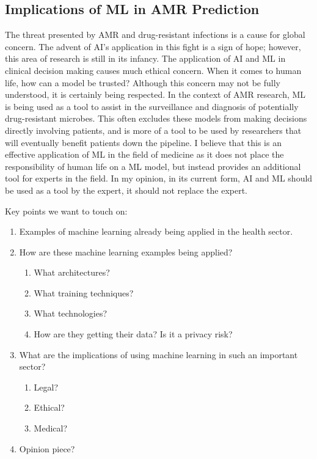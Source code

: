 \documentclass{article}
\begin{document}
\subsection{Implications of ML in AMR Prediction}

The threat presented by AMR and drug-resistant infections is a cause for global concern. The advent of AI's application in this fight is a sign of hope; however, this area of research is still in its infancy. The application of AI and ML in clinical decision making causes much ethical concern. When it comes to human life, how can a model be trusted? Although this concern may not be fully understood, it is certainly being respected. In the context of AMR research, ML is being used as a tool to assist in the surveillance and diagnosis of potentially drug-resistant microbes. This often excludes these models from making decisions directly involving patients, and is more of a tool to be used by researchers that will eventually benefit patients down the pipeline. I believe that this is an effective application of ML in the field of medicine as it does not place the responsibility of human life on a ML model, but instead provides an additional tool for experts in the field. In my opinion, in its current form, AI and ML should be used as a tool by the expert, it should not replace the expert. 

\newpage




Key points we want to touch on:
\begin{enumerate}
    \item Examples of machine learning already being applied in the health sector.
    \item How are these machine learning examples being applied?
    \begin{enumerate}
        \item What architectures?
        \item What training techniques?
        \item What technologies?
        \item How are they getting their data? Is it a privacy risk?
    \end{enumerate}
    \item What are the implications of using machine learning in such an important sector?
    \begin{enumerate}
        \item Legal?
        \item Ethical?
        \item Medical?
    \end{enumerate}
    \item Opinion piece?
\end{enumerate}
\end{document}
